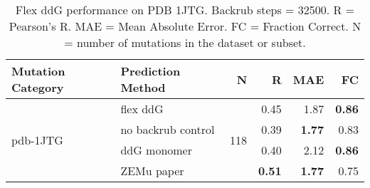 \begin{table}
  \begin{tabular}{llrrrr}
\toprule
Mutation Category &   Prediction Method &    N &    R &  MAE &   FC \\
\midrule
 \multirow{ 4}{*}{pdb-1JTG} & flex ddG & \multirow{ 4}{*}{118} & 0.45 & 1.87 & \textbf{0.86}  \\
 & no backrub control & & 0.39 & \textbf{1.77} & 0.83  \\
 & ddG monomer & & 0.40 & 2.12 & \textbf{0.86}  \\
 & ZEMu paper & & \textbf{0.51} & \textbf{1.77} & 0.75  \\
\bottomrule
\end{tabular}
  \caption[Flex ddG performance on PDB 1JTG]{
    Flex ddG performance on PDB 1JTG. Backrub steps = 32500. R = Pearson's R. MAE = Mean Absolute Error. FC = Fraction Correct. N = number of mutations in the dataset or subset.
  } \label{tab:table-pdb-1JTG}
\end{table}
